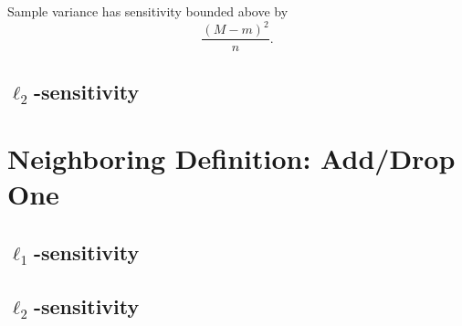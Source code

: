 \documentclass[11pt]{scrartcl} %
\begin{document}
\begin{corollary}
Sample variance has sensitivity bounded above by 
$$ \frac{(M-m)^2 }{n}.$$
\end{corollary}

\subsection{$\ell_2$-sensitivity}

\section{Neighboring Definition: Add/Drop One}
\subsection{$\ell_1$-sensitivity}
\subsection{$\ell_2$-sensitivity}



\end{document}
